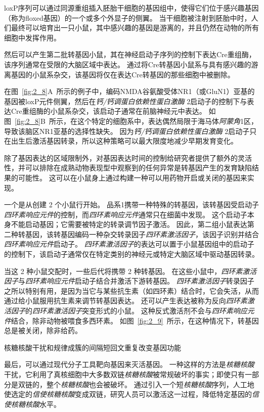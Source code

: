 \begin{proposition}[在实验动物中产生突变]
	\quad \quad loxP序列可以通过同源重组插入胚胎干细胞的基因组中，使得它们位于感兴趣基因（称为floxed基因）的一个或多个外显子的侧翼。
	当干细胞被注射到胚胎中时，人们最终可以培育出一只小鼠，其中感兴趣的基因是游离的，并且仍然在动物的所有细胞中发挥作用。
	
	\quad \quad 然后可以产生第二批转基因小鼠，其在神经启动子序列的控制下表达Cre重组酶，该序列通常在受限的大脑区域中表达。
	通过将Cre转基因小鼠系与具有感兴趣的游离基因的小鼠系杂交，该基因将仅在表达Cre转基因的那些细胞中被删除。
	
	\quad \quad 在图~\ref{fig:2_8}A~所示的例子中，编码NMDA谷氨酸受体NR1（或GluN1）亚基的基因被loxP元件侧翼，然后在\textit{钙/钙调蛋白依赖性蛋白激酶} 2启动子的控制下与表达Cre重组酶的小鼠系杂交，该启动子通常在前脑神经元中表达。
	如图~\ref{fig:2_8}B~所示，在这个特定的细胞系中，表达偶然局限于海马体\textit{阿蒙角}1区，导致该脑区NR1亚基的选择性缺失。
	因为\textit{钙/钙调蛋白依赖性蛋白激酶} 2启动子只在出生后激活基因转录，所以这种策略可以最大限度地减少早期发育变化。
	
	\quad \quad 除了基因表达的区域限制外，对基因表达时间的控制给研究者提供了额外的灵活性，并可以排除在成熟动物表现型中观察到的任何异常是转基因产生的发育缺陷结果的可能性。
	这可以在小鼠身上通过构建一种可以用药物开启或关闭的基因来实现。
	
	\quad \quad 一个是从创建 2 个小鼠行开始。
	品系1携带一种特殊的转基因，该转基因受启动子\textit{四环素响应元件}的控制，而\textit{四环素响应元件}通常只在细菌中发现。
	这个启动子本身不能启动基因；它需要被特定的转录调节因子激活。
	因此，第二组小鼠表达第二种转基因，该转基因编码一种杂交转录因子\textit{四环素激活因子}，该因子识别并结合\textit{四环素响应元件}启动子。
	\textit{四环素激活因子}的表达可以置于小鼠基因组中的启动子的控制下，该启动子通常仅在特定类别的神经元或特定大脑区域中驱动基因转录。
	
	\quad \quad 当这 2 种小鼠交配时，一些后代将携带 2 种转基因。
	在这些小鼠中，\textit{四环素激活因子}与\textit{四环素响应元件}启动子结合并激活下游转基因。
	\textit{四环素激活因子}转录因子之所以特别有用，是因为当它与某些抗生素（如四环素）结合时，它会失活，从而通过给小鼠服用抗生素来调节转基因表达。
	还可以产生表达被称为反向\textit{四环素激活因子}的\textit{四环素激活因子}突变形式的小鼠。
	这种反式激活剂不会与\textit{四环素响应元件}结合，除非动物被喂食多西环素。
	如图~\ref{fig:2_9}~所示，在这种情况下，转基因总是被关闭，除非给药。
	
	\quad \quad \textcolor[HTML]{00A652}{核糖核酸干扰和规律成簇的间隔短回文重复改变基因功能}
	
	\quad \quad 最后，可以通过现代分子工具靶向基因来灭活基因。
	一种这样的方法是\textit{核糖核酸}干扰，它利用了真核细胞中大多数双链\textit{核糖核酸}被常规破坏的事实；即使只有一部分是双链的，整个\textit{核糖核酸}也会被破坏。
	通过引入一个短\textit{核糖核酸}序列，人工地使选定的\textit{信使核糖核酸}变成双链，研究人员可以激活这一过程，降低特定基因的\textit{信使核糖核酸}水平。
	
\end{proposition}


